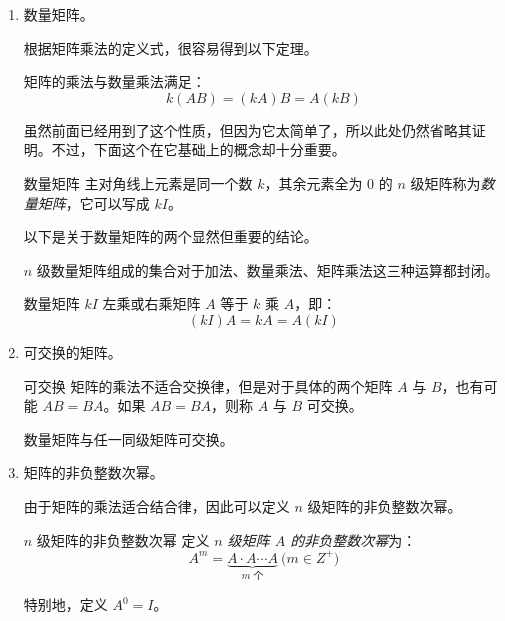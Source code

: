 \begin{enumerate}
	\item 数量矩阵。

	根据矩阵乘法的定义式，很容易得到以下定理。

	\begin{theorem}
		矩阵的乘法与数量乘法满足：
		$$
		k(AB) = (kA)B = A(kB)
		$$
	\end{theorem}

	虽然前面已经用到了这个性质，但因为它太简单了，所以此处仍然省略其证明。不过，下面这个在它基础上的概念却十分重要。

	\begin{definition}{数量矩阵}
		主对角线上元素是同一个数 $k$，其余元素全为 $0$ 的 $n$ 级矩阵称为\emph{数量矩阵}，它可以写成 $kI$。
	\end{definition}

	以下是关于数量矩阵的两个显然但重要的结论。

	\begin{theorem}[数量矩阵的运算封闭性]
		$n$ 级数量矩阵组成的集合对于加法、数量乘法、矩阵乘法这三种运算都封闭。
	\end{theorem}

	\begin{theorem}
		数量矩阵 $kI$ 左乘或右乘矩阵 $A$ 等于 $k$ 乘 $A$，即：
		$$
		(kI)A = kA = A(kI)
		$$
	\end{theorem}

	\item 可交换的矩阵。

	\begin{definition}{可交换}
		矩阵的乘法不适合交换律，但是对于具体的两个矩阵 $A$ 与 $B$，也有可能 $AB = BA$。如果 $AB = BA$，则称 $A$ 与 $B$ 可交换。
	\end{definition}

	\begin{theorem}
		数量矩阵与任一同级矩阵可交换。
	\end{theorem}

	\item 矩阵的非负整数次幂。

	由于矩阵的乘法适合结合律，因此可以定义 $n$ 级矩阵的非负整数次幂。

	\begin{definition}{$n$ 级矩阵的非负整数次幂}
		定义 \emph{$n$ 级矩阵 $A$ 的非负整数次幂}为：
		$$
		A^m = \underset{\text{$m$ 个}}{\underbrace{A \cdot A \cdots A}} \pod{m \in Z^+}
		$$

		特别地，定义 $A^0 = I$。
	\end{definition}
\end{enumerate}